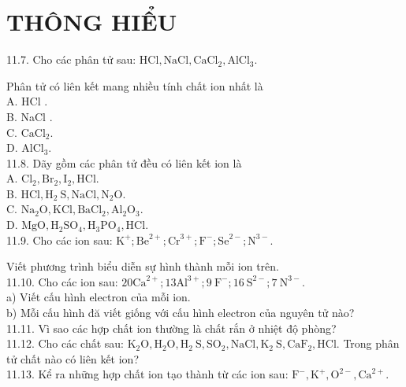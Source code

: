 \documentclass[10pt]{article}
\begin{document}
\section*{THÔNG HIỂU}
11.7. Cho các phân tử sau: $\mathrm{HCl}, \mathrm{NaCl}, \mathrm{CaCl}_{2}, \mathrm{AlCl}_{3}$.

Phân tử có liên kết mang nhiều tính chất ion nhất là\\
A. HCl .\\
B. NaCl .\\
C. $\mathrm{CaCl}_{2}$.\\
D. $\mathrm{AlCl}_{3}$.\\
11.8. Dãy gồm các phân tử đều có liên kết ion là\\
A. $\mathrm{Cl}_{2}, \mathrm{Br}_{2}, \mathrm{I}_{2}, \mathrm{HCl}$.\\
B. $\mathrm{HCl}, \mathrm{H}_{2} \mathrm{~S}, \mathrm{NaCl}, \mathrm{N}_{2} \mathrm{O}$.\\
C. $\mathrm{Na}_{2} \mathrm{O}, \mathrm{KCl}, \mathrm{BaCl}_{2}, \mathrm{Al}_{2} \mathrm{O}_{3}$.\\
D. $\mathrm{MgO}, \mathrm{H}_{2} \mathrm{SO}_{4}, \mathrm{H}_{3} \mathrm{PO}_{4}, \mathrm{HCl}$.\\
11.9. Cho các ion sau: $\mathrm{K}^{+} ; \mathrm{Be}^{2+} ; \mathrm{Cr}^{3+} ; \mathrm{F}^{-} ; \mathrm{Se}^{2-} ; \mathrm{N}^{3-}$.

Viết phương trình biểu diễn sự hình thành mỗi ion trên.\\
11.10. Cho các ion sau: $20 \mathrm{Ca}^{2+} ; 13 \mathrm{Al}^{3+} ; 9 \mathrm{~F}^{-} ; 16 \mathrm{~S}^{2-} ; 7 \mathrm{~N}^{3-}$.\\
a) Viết cấu hình electron của mỗi ion.\\
b) Mỗi cấu hình đă viết giống với cấu hình electron của nguyên tử nào?\\
11.11. Vì sao các hợp chất ion thường là chất rắn ở nhiệt độ phòng?\\
11.12. Cho các chất sau: $\mathrm{K}_{2} \mathrm{O}, \mathrm{H}_{2} \mathrm{O}, \mathrm{H}_{2} \mathrm{~S}, \mathrm{SO}_{2}, \mathrm{NaCl}, \mathrm{K}_{2} \mathrm{~S}, \mathrm{CaF}_{2}, \mathrm{HCl}$. Trong phân tử chất nào có liên kết ion?\\
11.13. Kể ra những hợp chất ion tạo thành từ các ion sau: $\mathrm{F}^{-}, \mathrm{K}^{+}, \mathrm{O}^{2-}, \mathrm{Ca}^{2+}$.
\end{document}
